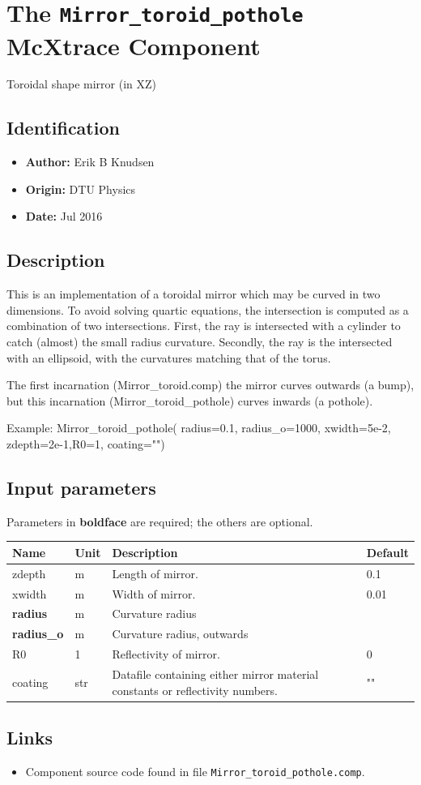 \section{The \texttt{Mirror\_toroid\_pothole} McXtrace Component}
Toroidal shape mirror (in XZ)

\subsection*{Identification}
\begin{itemize}
  \item \textbf{Author:} Erik B Knudsen
  \item \textbf{Origin:} DTU Physics
  \item \textbf{Date:} Jul 2016
\end{itemize}

\subsection*{Description}
This is an implementation of a toroidal mirror which may be curved in two dimensions. To avoid solving quartic equations, the intersection is computed as a combination of two intersections. First, the ray is intersected with a cylinder to catch (almost) the small radius curvature. Secondly, the ray is the intersected with an ellipsoid, with the curvatures matching that of the torus.

The first incarnation (Mirror\_toroid.comp) the mirror curves outwards (a bump), but this incarnation (Mirror\_toroid\_pothole) curves inwards (a pothole).

Example: Mirror\_toroid\_pothole( radius=0.1, radius\_o=1000, xwidth=5e-2, zdepth=2e-1,R0=1, coating="")

\subsection*{Input parameters}
Parameters in \textbf{boldface} are required; the others are optional.

\begin{longtable}{p{}p{}p{}p{}}
\toprule
\textbf{Name} & \textbf{Unit} & \textbf{Description} & \textbf{Default} \\
\midrule
\endhead
zdepth & m & Length of mirror. & 0.1 \\
xwidth & m & Width of mirror. & 0.01 \\
\textbf{radius} & m & Curvature radius &  \\
\textbf{radius\_o} & m & Curvature radius, outwards &  \\
R0 & 1 & Reflectivity of mirror. & 0 \\
coating & str & Datafile containing either mirror material constants or reflectivity  numbers. & "" \\
\bottomrule
\end{longtable}

\subsection*{Links}
\begin{itemize}
  \item Component source code found in file \texttt{Mirror\_toroid\_pothole.comp}.
\end{itemize}
